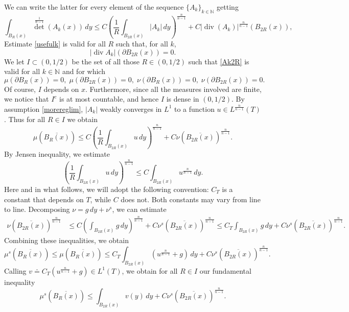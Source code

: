 \documentclass[10pt,reqno]{amsart}
\numberwithin{equation}{section}
\newcommand{\N}{\mathbb{N}}
\DeclareMathOperator{\dv}{div}
\theoremstyle{plain}
\theoremstyle{definition}
\theoremstyle{remark}
\begin{document}
We can write the latter for every element of the sequence $\{A_k\}_{k \in \N}$ getting
\begin{equation}\label{usefulk}
\int_{B_R(x)}{\det}^\frac{1}{n-1}(A_k(x))\,dy \le C\left(\frac{1}{R}\int_{B_{2R}(x)}|A_k|\,dy\right)^\frac{n}{n - 1} + C|\dv(A_k)|^\frac{n}{n-1}(B_{2R}(x)),
\end{equation}
Estimate \eqref{usefulk} is valid for all $R$ such that, for all $k$,
\begin{equation}\label{Ak2R}
|\dv A_k|(\partial B_{2R}(x)) = 0.
\end{equation}
We let $I \subset (0,1/2)$ be the set of all those $R \in (0,1/2)$ such that \eqref{Ak2R} is valid for all $k \in \N$ and for which
\begin{equation}\label{R2R}
\mu(\partial{B_R(x)}) = 0,\; \mu(\partial{B_{2R}(x)}) = 0,\; \nu(\partial B_R(x)) = 0,\; \nu(\partial B_{2R}(x)) = 0.
\end{equation}
Of course, $I$ depends on $x$. Furthermore, since all the measures involved are finite, we notice that $I^c$ is at most countable, and hence $I$ is dense in $(0,1/2)$. By assumption \eqref{morereglim}, $|A_k|$ weakly converges in $L^1$ to a function $u \in L^\frac{n}{n-1}(T)$. Thus for all $R \in I$ we obtain
\begin{equation}\label{initial}
\mu(\overline{B_{R}(x)}) \le C\left(\frac{1}{R}\int_{B_{2R}(x)}u \,dy\right)^\frac{n}{n - 1} + C\nu(\overline{B_{2R}(x)})^\frac{n}{n-1}.
\end{equation}
By Jensen inequality, we estimate
\[
\left(\frac{1}{R}\int_{B_{2R}(x)}u \,dy\right)^\frac{n}{n - 1} \le C\int_{B_{2R}(x)}u^\frac{n}{n-1}\,dy.
\]
Here and in what follows, we will adopt the following convention: $C_T$ is a constant that depends on $T$, while $C$ does not. Both constants may vary from line to line. Decomposing
$\nu = g\,dy + \nu^s$, we can estimate
\begin{align*}
\nu(\overline{B_{2R}(x)})^\frac{n}{n-1} &\le C\left(\int_{B_{2R}(x)}g\,dy\right)^\frac{n}{n-1}+ C\nu^s(\overline{B_{2R}(x)})^\frac{n}{n-1}\le C_T\int_{B_{2R}(x)}g\,dy + C\nu^s(\overline{B_{2R}(x)})^\frac{n}{n-1}.
\end{align*}
Combining these inequalities, we obtain
\[
\mu^s(\overline{B_R(x)}) \le \mu(\overline{B_R(x)}) \le C_T\int_{B_{2R}(x)}\left(u^\frac{n}{n-1} +g\right)  \,dy + C\nu^s(\overline{B_{2R}(x)})^\frac{n}{n-1}.
\]
Calling $v \doteq C_T(u^\frac{n}{n-1} +g) \in L^1(T)$, we obtain for all $R \in I$ our fundamental inequality
\begin{equation}\label{MI}
\mu^s(\overline{B_R(x)}) \le  \int_{B_{2R}(x)}v(y) \,dy+ C\nu^s(\overline{B_{2R}(x)})^\frac{n}{n-1}.
\end{equation}
\end{document}
